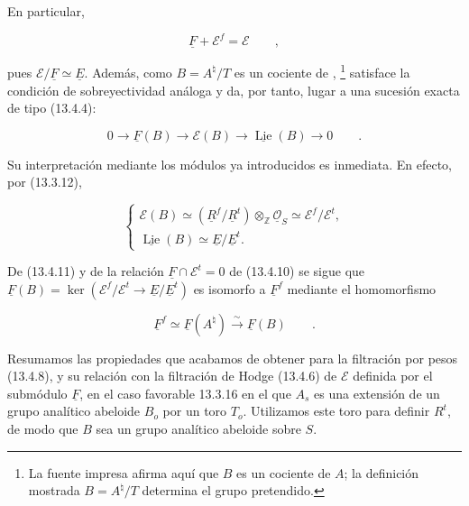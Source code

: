 \noindent
En particular,

\begin{equation}\tag{13.4.13}
 \underline F+\mathcal E^f=\mathcal E\qquad ,
\end{equation}

\noindent
pues $\mathcal E/\underline F\simeq\underline E$. Además, como
$B=A^\natural/T$ es un cociente de ,
\footnote{La fuente impresa afirma aquí que $B$ es un cociente de $A$;
la definición mostrada $B=A^\natural/T$ determina el grupo pretendido.}
satisface la condición de sobreyectividad análoga y da, por tanto,
lugar a una sucesión exacta de tipo (13.4.4):

\begin{equation}\tag{13.4.14}
 0\longrightarrow\underline F(B)\longrightarrow\mathcal E(B)
 \longrightarrow\underline{\operatorname{Lie}}(B)
 \longrightarrow0\qquad .
\end{equation}

\noindent
Su interpretación mediante los módulos ya introducidos es inmediata.
En efecto, por (13.3.12),

\begin{equation}\tag{13.4.15}
 \left\{
 \begin{array}{l}
  \mathcal E(B)\simeq
  (\underline R^f/\underline R^t)\otimes_{\mathbb Z}
  \underline{\mathcal O}_S
  \simeq\mathcal E^f/\mathcal E^t,\\[2ex]
  \underline{\operatorname{Lie}}(B)
  \simeq\underline E/\underline E^t.
 \end{array}
 \right.
\end{equation}

\noindent
De (13.4.11) y de la relación
$\underline F\cap\mathcal E^t=0$ de (13.4.10) se sigue que
$\underline F(B)=\ker(\mathcal E^f/\mathcal E^t
\longrightarrow\underline E/\underline E^t)$ es isomorfo a
$\underline F^f$ mediante el homomorfismo

\begin{equation}\tag{13.4.16}
 \underline F^f\simeq\underline F(A^\natural)
 \stackrel{\sim}{\longrightarrow}\underline F(B)\qquad .
\end{equation}

\noindent
Resumamos las propiedades que acabamos de obtener para la filtración
por pesos (13.4.8), y su relación con la filtración de Hodge (13.4.6)
de $\mathcal E$ definida por el submódulo $\underline F$, en el caso
favorable 13.3.16 en el que $A_s$ es una extensión de un grupo analítico
abeloide $B_o$ por un toro $T_o$. Utilizamos este toro para definir
$R^t$, de modo que $B$ sea un grupo analítico abeloide sobre $S$.

